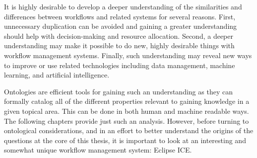 It is highly desirable to develop a deeper understanding of the similarities and
differences between workflows and related systems for several reasons. First,
unnecessary duplication can be avoided and gaining a greater
understanding should help with decision-making and resource allocation. Second,
a deeper understanding may make it possible to do new, highly desirable things
with workflow management systems. Finally, such understanding may reveal new
ways to improve or use related technologies including data management, machine learning, and
artificial intelligence.

Ontologies are efficient tools for gaining such an understanding as they
can formally catalog all of the different properties relevant to gaining
knowledge in a given topical area. This can be done in both human and machine
readable ways. The following chapters provide just such an analysis. However,
before turning to ontological considerations, and in an effort to better
understand the origins of the questions at the core of this thesis, it is
important to look at an interesting and somewhat unique workflow management
system: Eclipse ICE.

